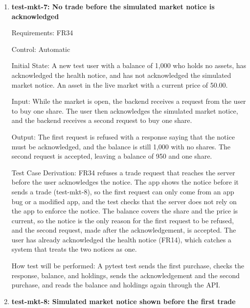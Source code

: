 \documentclass[12pt, titlepage]{article}
\begin{document}
\begin{enumerate}
How test will be performed: A pytest test sets the test provider's price,
moves the backend's clock to each time, and reads the price, its time, and
whether it is delayed through the API. A Jest test then renders the app's
price display with each of the three responses and checks that it shows the
time and shows the ``Delayed'' marker only for the delayed price.

\item{\textbf{test-mkt-7: No trade before the simulated market notice is
acknowledged}\\}

Requirements: FR34

Control: Automatic

Initial State: A new test user with a balance of 1,000 who holds no assets,
has acknowledged the health notice, and has not acknowledged the simulated
market notice. An asset in the live market with a current price of 50.00.

Input: While the market is open, the backend receives a request from the user
to buy one share. The user then acknowledges the simulated market notice, and
the backend receives a second request to buy one share.

Output: The first request is refused with a response saying that the notice
must be acknowledged, and the balance is still 1,000 with no shares. The
second request is accepted, leaving a balance of 950 and one share.

Test Case Derivation: FR34 refuses a trade request that reaches the server
before the user acknowledges the notice. The app shows the notice before it
sends a trade (test-mkt-8), so the first request can only come from an app bug
or a modified app, and the test checks that the server does not rely on the
app to enforce the notice. The balance covers the share and the price is
current, so the notice is the only reason for the first request to be
refused, and the second request, made after the acknowledgement, is accepted.
The user has already acknowledged the health notice (FR14), which catches a
system that treats the two notices as one.

How test will be performed: A pytest test sends the first purchase, checks the
response, balance, and holdings, sends the acknowledgement and the second
purchase, and reads the balance and holdings again through the API.

\item{\textbf{test-mkt-8: Simulated market notice shown before the first
trade}\\}


\end{enumerate}
\end{document}
